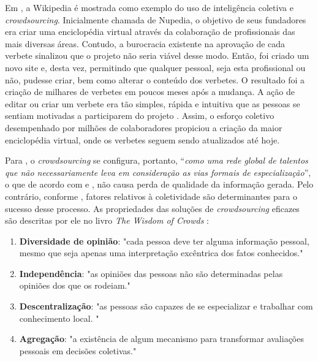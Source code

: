 Em \cite{pintado2011}, a Wikipedia é mostrada como exemplo do uso de inteligência coletiva e \textit{crowdsourcing}. Inicialmente chamada de Nupedia, o objetivo de seus fundadores era criar uma enciclopédia virtual através da colaboração de profissionais das mais diversas áreas. Contudo, a burocracia existente na aprovação de cada verbete sinalizou que o projeto não seria viável desse modo. Então, foi criado um novo site e, desta vez, permitindo que qualquer pessoal, seja esta profissional ou não, pudesse criar, bem como alterar o conteúdo dos verbetes. O resultado foi a criação de milhares de verbetes em poucos meses após a mudança. A ação de editar ou criar um verbete era tão simples, rápida e intuitiva que as pessoas se sentiam motivadas a participarem do projeto \citep{pintado2011}. Assim, o esforço coletivo desempenhado por milhões de colaboradores propiciou a criação da maior enciclopédia virtual, onde os verbetes seguem sendo atualizados até hoje.   

Para \cite{pintado2011}, o \textit{crowdsourcing} se configura, portanto, “\textit{como uma rede global de talentos que não necessariamente leva em consideração as vias formais de especialização}”, o que de acordo com \cite{surowiecki2005} e \citep{Hu2012}, não causa perda de qualidade da informação gerada. Pelo contrário, conforme  \cite{surowiecki2005}, fatores relativos à coletividade são determinantes para o sucesso desse processo. As propriedades das soluções de \textit{crowdsourcing} eficazes são descritas por ele no livro \textit{The Wisdom of Crowds} \citep{surowiecki2005}: 

\begin{enumerate}
\item \textbf{Diversidade de opinião}: "cada pessoa deve ter alguma informação pessoal, mesmo que seja apenas uma interpretação excêntrica dos fatos conhecidos." 
\item \textbf{Independência}: "as opiniões das pessoas não são determinadas pelas opiniões dos que os rodeiam." 
\item \textbf{Descentralização}: "as pessoas são capazes de se especializar e trabalhar com conhecimento local. "
\item \textbf{Agregação}: "a existência de algum mecanismo para transformar avaliações pessoais em decisões coletivas."
\end{enumerate}

